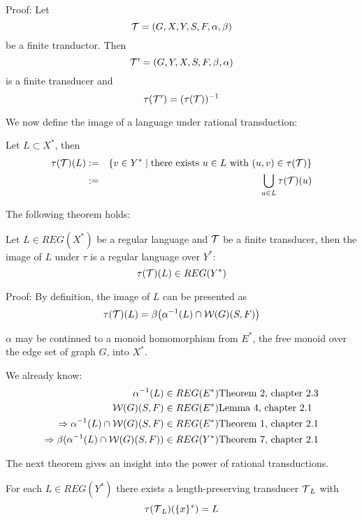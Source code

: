 Proof: Let \[ \mbox{$\mathcal{T}$} = (G, X, Y, S, F, \alpha, \beta) \] be a finite tranductor.
Then \[ \mbox{$\mathcal{T'}$} = (G, Y, X, S, F, \beta, \alpha) \] is a finite transducer and
\[ \tau(\mbox{$\mathcal{T'}$}) = (\tau(\mbox{$\mathcal{T}$}))^{-1} \]

We now define the image of a language under rational transduction:

\begin{definition}
Let $L \subset X^*$, then
\begin{eqnarray*}
\tau(\mbox{$\mathcal{T}$})(L) & := & \{ v \in Y^* \mid \mbox{there exists } u \in L \mbox{
with } (u, v) \in \tau(\mbox{$\mathcal{T}$}) \} \\
& := & \bigcup_{u \in L} \tau(\mbox{$\mathcal{T}$})(u)
\end{eqnarray*}
\end{definition}

The following theorem holds:

\begin{theorem}
Let $L \in REG(X^*)$ be a regular language and $\mbox{$\mathcal{T}$}$ be a finite transducer,
then the image of $L$ under $\tau$ is a regular language over $Y^*$:
\[ \tau(\mbox{$\mathcal{T}$})(L) \in REG(Y^*) \]
\end{theorem}

Proof: By definition, the image of $L$ can be presented as
\[ \tau(\mbox{$\mathcal{T}$})(L) = \beta\big( \alpha^{-1}(L) \cap \mbox{$\mathcal{W}(G)$}(S, F) \big) \]

$\alpha$ may be continued to a monoid homomorphism from $E^*$, the free monoid
over the edge set of graph $G$, into $X^*$.

We already know:
\begin{eqnarray*}
\alpha^{-1}(L) \in REG(E^*)    & \mbox{Theorem 2, chapter 2.3} \\
\mbox{$\mathcal{W}(G)$}(S, F) \in REG(E^*) & \mbox{Lemma 4, chapter 2.1} \\
\Rightarrow \alpha^{-1}(L) \cap \mbox{$\mathcal{W}(G)$}(S, F) \in
REG(E^*) & \mbox{Theorem 1, chapter 2.1} \\
\Rightarrow \beta(\alpha^{-1}(L) \cap \mbox{$\mathcal{W}(G)$}(S, F)) \in
REG(Y^*) & \mbox{Theorem 7, chapter 2.1}
\end{eqnarray*}

The next theorem gives an insight into the power of rational transductions.

\begin{theorem}
For each $L \in REG(Y^*)$ there exists a length-preserving transducer
$\mbox{$\mathcal{T}$}_L$ with \[ \tau(\mbox{$\mathcal{T}$}_L)(\{x\}^*) = L \]
\end{theorem}

